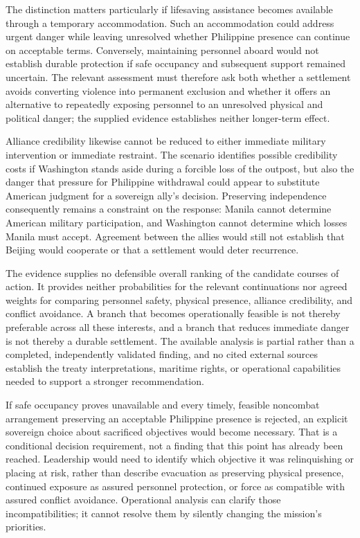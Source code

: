 \documentclass[11pt]{article}
\begin{document}
The distinction matters particularly if lifesaving assistance becomes available through a temporary accommodation. Such an accommodation could address urgent danger while leaving unresolved whether Philippine presence can continue on acceptable terms. Conversely, maintaining personnel aboard would not establish durable protection if safe occupancy and subsequent support remained uncertain. The relevant assessment must therefore ask both whether a settlement avoids converting violence into permanent exclusion and whether it offers an alternative to repeatedly exposing personnel to an unresolved physical and political danger; the supplied evidence establishes neither longer-term effect.

Alliance credibility likewise cannot be reduced to either immediate military intervention or immediate restraint. The scenario identifies possible credibility costs if Washington stands aside during a forcible loss of the outpost, but also the danger that pressure for Philippine withdrawal could appear to substitute American judgment for a sovereign ally\textquoteright{}s decision. Preserving independence consequently remains a constraint on the response: Manila cannot determine American military participation, and Washington cannot determine which losses Manila must accept. Agreement between the allies would still not establish that Beijing would cooperate or that a settlement would deter recurrence.

The evidence supplies no defensible overall ranking of the candidate courses of action. It provides neither probabilities for the relevant continuations nor agreed weights for comparing personnel safety, physical presence, alliance credibility, and conflict avoidance. A branch that becomes operationally feasible is not thereby preferable across all these interests, and a branch that reduces immediate danger is not thereby a durable settlement. The available analysis is partial rather than a completed, independently validated finding, and no cited external sources establish the treaty interpretations, maritime rights, or operational capabilities needed to support a stronger recommendation.

If safe occupancy proves unavailable and every timely, feasible noncombat arrangement preserving an acceptable Philippine presence is rejected, an explicit sovereign choice about sacrificed objectives would become necessary. That is a conditional decision requirement, not a finding that this point has already been reached. Leadership would need to identify which objective it was relinquishing or placing at risk, rather than describe evacuation as preserving physical presence, continued exposure as assured personnel protection, or force as compatible with assured conflict avoidance. Operational analysis can clarify those incompatibilities; it cannot resolve them by silently changing the mission\textquoteright{}s priorities.
\end{document}
